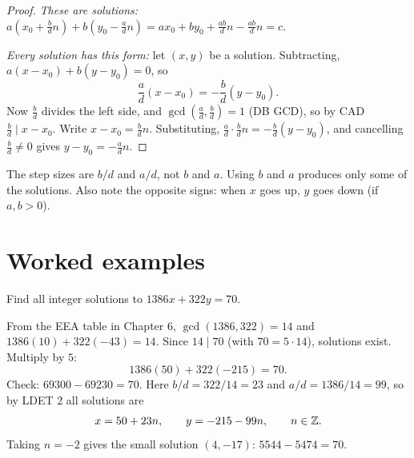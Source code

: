 \begin{proof}
\emph{These are solutions:}
$a\left(x_0 + \tfrac bd n\right) + b\left(y_0 - \tfrac ad n\right) = ax_0 + by_0 + \tfrac{ab}{d}n
- \tfrac{ab}{d}n = c$.

\emph{Every solution has this form:} let $(x,y)$ be a solution. Subtracting,
$a(x - x_0) + b(y - y_0) = 0$, so
\[ \frac ad (x - x_0) = -\frac bd (y - y_0). \]
Now $\frac bd$ divides the left side, and $\gcd(\frac ad, \frac bd) = 1$ (DB GCD), so by CAD
$\frac bd \mid x - x_0$. Write $x - x_0 = \frac bd n$. Substituting,
$\frac ad\cdot\frac bd n = -\frac bd(y - y_0)$, and cancelling $\frac bd \ne 0$ gives
$y - y_0 = -\frac ad n$.
\end{proof}

\begin{important}
The step sizes are $b/d$ and $a/d$, not $b$ and $a$. Using $b$ and $a$ produces only some of the
solutions. Also note the opposite signs: when $x$ goes up, $y$ goes down (if $a,b > 0$).
\end{important}

\section{Worked examples}

\begin{example}
Find all integer solutions to $1386x + 322y = 70$.

From the EEA table in Chapter 6, $\gcd(1386, 322) = 14$ and $1386(10) + 322(-43) = 14$. Since
$14 \mid 70$ (with $70 = 5\cdot 14$), solutions exist. Multiply by $5$:
\[ 1386(50) + 322(-215) = 70. \]
Check: $69300 - 69230 = 70$. Here $b/d = 322/14 = 23$ and $a/d = 1386/14 = 99$, so by LDET 2
all solutions are
\[ x = 50 + 23n,\qquad y = -215 - 99n,\qquad n\in\mathbb{Z}. \]
Taking $n = -2$ gives the small solution $(4, -17)$: $5544 - 5474 = 70$.
\end{example}

